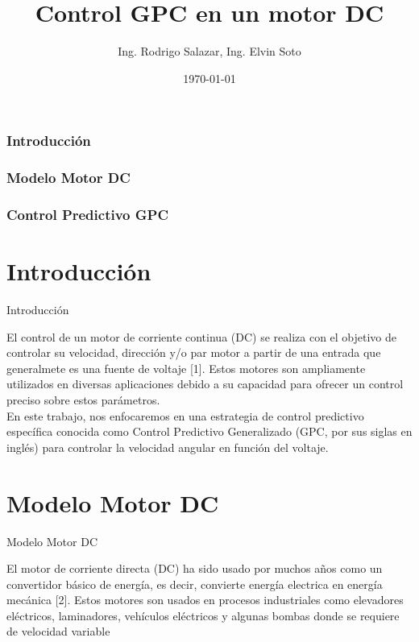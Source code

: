 \documentclass{beamer}
\title{Control GPC en un motor DC}
\author{Ing. Rodrigo Salazar, Ing. Elvin Soto}
\institute{UACH}
\date{\today}
\begin{document}
\begin{frame}
  \titlepage
\end{frame}


\begin{frame}
  \frametitle{Introducción}
  \frametitle{Modelo Motor DC}
  \frametitle{Control Predictivo GPC}
  \tableofcontents
\end{frame}

\section{Introducción}
\begin{frame}{Introducción}
\begin{justify}
\vspace{0.3cm}
\begin{itemize}
  El control de un motor de corriente continua (DC) se realiza con el objetivo de controlar su velocidad, dirección y/o par motor a partir de una entrada que generalmete es una fuente de voltaje [1]. Estos motores son ampliamente utilizados en diversas aplicaciones debido a su capacidad para ofrecer un control preciso sobre estos parámetros. 
  \\
  En este trabajo, nos enfocaremos en una estrategia de control predictivo específica conocida como Control Predictivo Generalizado (GPC, por sus siglas en inglés) para controlar la velocidad angular en función del voltaje.
\end{itemize}
\end{justify}
\end{frame}

\section{Modelo Motor DC}
\begin{frame}{Modelo Motor DC}
\begin{justify}
\vspace{0.3cm}
\begin{itemize}
El motor de corriente directa (DC) ha sido usado por muchos años como un convertidor básico de energía, es decir, convierte energía electrica en energía mecánica [2]. Estos motores son usados en procesos industriales como elevadores eléctricos, laminadores, vehículos eléctricos y algunas bombas donde se requiere de velocidad variable
\end{itemize}
\end{justify}
\end{frame}
\end{document}
